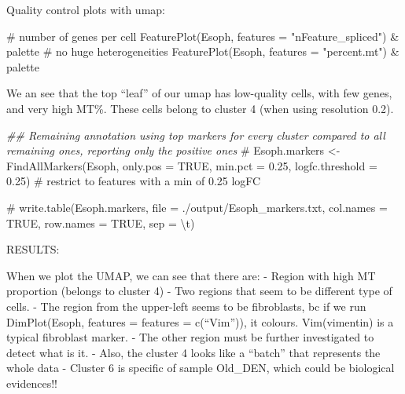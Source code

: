 \documentclass[
  letterpaper,
  DIV=11,
  numbers=noendperiod]{scrreprt}
\newenvironment{Shaded}{\begin{snugshade}}{\end{snugshade}}
\newcommand{\AttributeTok}[1]{\textcolor[rgb]{0.40,0.45,0.13}{#1}}
\newcommand{\CommentTok}[1]{\textcolor[rgb]{0.37,0.37,0.37}{#1}}
\newcommand{\DocumentationTok}[1]{\textcolor[rgb]{0.37,0.37,0.37}{\textit{#1}}}
\newcommand{\FloatTok}[1]{\textcolor[rgb]{0.68,0.00,0.00}{#1}}
\newcommand{\FunctionTok}[1]{\textcolor[rgb]{0.28,0.35,0.67}{#1}}
\newcommand{\NormalTok}[1]{\textcolor[rgb]{0.00,0.23,0.31}{#1}}
\newcommand{\OtherTok}[1]{\textcolor[rgb]{0.00,0.23,0.31}{#1}}
\newcommand{\SpecialCharTok}[1]{\textcolor[rgb]{0.37,0.37,0.37}{#1}}
\newcommand{\StringTok}[1]{\textcolor[rgb]{0.13,0.47,0.30}{#1}}
\begin{document}
Quality control plots with umap:

\begin{Shaded}
\begin{Highlighting}[]
\CommentTok{\# number of genes per cell}
\FunctionTok{FeaturePlot}\NormalTok{(Esoph, }\AttributeTok{features =} \StringTok{"nFeature\_spliced"}\NormalTok{) }\SpecialCharTok{\&}\NormalTok{ palette }\CommentTok{\# no huge heterogeneities}
\FunctionTok{FeaturePlot}\NormalTok{(Esoph, }\AttributeTok{features =} \StringTok{"percent.mt"}\NormalTok{) }\SpecialCharTok{\&}\NormalTok{ palette }
\end{Highlighting}
\end{Shaded}

We an see that the top ``leaf'' of our umap has low-quality cells, with
few genes, and very high MT\%. These cells belong to cluster 4 (when
using resolution 0.2).

\begin{Shaded}
\end{Shaded}

\begin{Shaded}
\begin{Highlighting}[]
\DocumentationTok{\#\# Remaining annotation using top markers for every cluster compared to all remaining ones, reporting only the positive ones}
\CommentTok{\# Esoph.markers \textless{}{-} FindAllMarkers(Esoph, only.pos = TRUE, min.pct = 0.25, logfc.threshold = 0.25) \# restrict to features with a min of 0.25 logFC}

\CommentTok{\# write.table(Esoph.markers, file = \textquotesingle{}./output/Esoph\_markers.txt\textquotesingle{}, col.names = TRUE, row.names = TRUE, sep = \textquotesingle{}\textbackslash{}t\textquotesingle{})}
\end{Highlighting}
\end{Shaded}

RESULTS:

When we plot the UMAP, we can see that there are: - Region with high MT
proportion (belongs to cluster 4) - Two regions that seem to be
different type of cells. - The region from the upper-left seems to be
fibroblasts, bc if we run DimPlot(Esoph, features = features =
c(``Vim'')), it colours. Vim(vimentin) is a typical fibroblast marker. -
The other region must be further investigated to detect what is it. -
Also, the cluster 4 looks like a ``batch'' that represents the whole
data - Cluster 6 is specific of sample Old\_DEN, which could be
biological evidences!!
\end{document}
